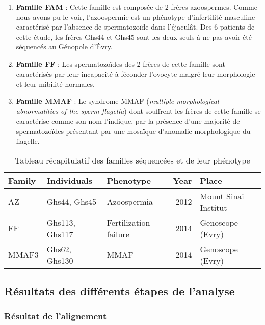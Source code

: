 \documentclass[12pt,twoside]{reedthesis}
\providecommand{\tightlist}{%
  \setlength{\itemsep}{0pt}\setlength{\parskip}{0pt}}
\theoremstyle{definition}
\theoremstyle{definition}
\theoremstyle{remark}
\begin{document}
  \begin{enumerate}
  \def\labelenumi{\arabic{enumi}.}
  \tightlist
  \item
    \textbf{Famille FAM} : Cette famille est composée de 2 frères
    azoospermes. Comme nous avons pu le voir, l'azoospermie est un
    phénotype d'infertilité masculine caractérisé par l'absence de
    spermatozoïde dans l'éjaculât. Des 6 patients de cette étude, les
    frères Ghs44 et Ghs45 sont les deux seuls à ne pas avoir été séquencés
    au Génopole d'Évry.\\
  \item
    \textbf{Famille FF} : Les spermatozoïdes des 2 frères de cette famille
    sont caractérisés par leur incapacité à féconder l'ovocyte malgré leur
    morphologie et leur mibilité normales.\\
  \item
    \textbf{Famille MMAF} : Le syndrome MMAF (\emph{multiple morphological
    abnormalities of the sperm flagella}) dont souffrent les frères de
    cette famille se caractérise comme son nom l'indique, par la présence
    d'une majorité de spermatozoïdes présentant par une mosaïque
    d'anomalie morphologique du flagelle.
  \end{enumerate}
  
  \begin{longtable}[t]{lllrl}
  \caption{\label{tab:tabfam}Tableau récapitulatif des familles séquencées et de leur phénotype}\\
  \toprule
  Family & Individuals & Phenotype & Year & Place\\
  \midrule
  AZ & Ghs44, Ghs45 & Azoospermia & 2012 & Mount Sinai Institut\\
  FF & Ghs113, Ghs117 & Fertilization failure & 2014 & Genoscope (Evry)\\
  MMAF3 & Ghs62, Ghs130 & MMAF & 2014 & Genoscope (Evry)\\
  \bottomrule
  \end{longtable}
  
  \newpage 
  
  \subsection{Résultats des différents étapes de
  l'analyse}\label{resultats-des-differents-etapes-de-lanalyse}
  
  \subsubsection{Résultat de l'alignement}\label{resultat-de-lalignement}
  
\end{document}
